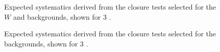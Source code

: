 
\begin{figure}[]
  \centering
  \caption{\label{fig:systematics-ttW} Expected systematics derived from
  the closure tests selected for the $W$ and \ttbar backgrounds, shown for
  3 \ifb.}
\end{figure}

\begin{figure}[]
  \centering
  \caption{\label{fig:systematics-Zinv} Expected systematics derived from
  the closure tests selected for the \znunu backgrounds, shown for 3 \ifb.}
\end{figure}


